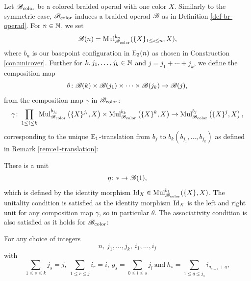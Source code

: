 \begin{eg}
    Let $\mathscr{B}_{\text{color}}$ be a colored braided operad with one color $X$. Similarly to the
    symmetric case, $\mathscr{B}_{\text{color}}$ induces a braided operad $\mathscr{B}$ as in Definition
    \ref{def-br-operad}. For $n \in \mathbb{N}$, we set
    \[
        \mathscr{B}(n) = \operatorname{Mul}_{\mathscr{B}_{\text{color}}}^{b_n}(\{X\}_{1 \leq i \leq n}, X),
    \]
    where $b_n$ is our basepoint configuration in $\operatorname{E}_2(n)$ as chosen in
    Construction \ref{con:unicover}. Further for $k, j_1, \dots, j_k \in \mathbb{N}$ and
    $j = j_1 + \cdots + j_k$, we define the composition map
    \[
        \theta \colon \mathscr{B}(k) \times \mathscr{B}(j_1) \times \cdots \times \mathscr{B}(j_k) \to \mathscr{B}(j),
    \]
    from the composition map $\gamma$ in $\mathscr{B}_{\text{color}}$:
    \[
        \gamma \colon  \prod_{1 \leq i \leq k} \operatorname{Mul}_{\mathscr{B}_{\text{color}}}^{b_{j_i}}\left(\{X\}^{j_i}, X\right) \times \operatorname{Mul}_{\mathscr{B}_{\text{color}}}^{b_k}\left(\{X\}^k, X\right) \to \operatorname{Mul}_{\mathscr{B}_{\text{color}}}^{b_j}\left(\{X\}^j, X\right),
    \]
    corresponding to the unique $\operatorname{E}_1$-translation from $b_j$ to $b_k(b_{j_1},
    \dots, b_{j_k})$ as defined in Remark \ref{rem:e1-translation}:
    \begin{center}
        \end{center}

    There is a unit
    \[
        \eta \colon \ast \to \mathscr{B}(1),
    \]
    which is defined by the identity morphism $\operatorname{Id}_X \in \operatorname{Mul}_{\mathscr{B}_{\text{color}}}^{b_1}(\{X\},
    X)$. The unitality condition is satisfied as the identity morphism $\operatorname{Id}_X$
    is the left and right unit for any composition map $\gamma$, so in
    particular $\theta$. The associativity condition is also satisfied as it
    holds for $\mathscr{B}_{\text{color}}$: 
    
    For any choice of integers
    \[
        n,  \ j_1, \dots, j_k, \ i_1, \dots, i_j
    \]
    with
    \[
        \sum_{1 \leq s \leq k} j_s = j, ~ \sum_{1 \leq r \leq j} i_r = i, \ g_s = \sum_{0 \leq l \leq s} j_l \ \text{and} \ h_s = \sum_{1 \leq q \leq j_s} i_{g_{s-1}+q},
    \]
    

\end{eg}

